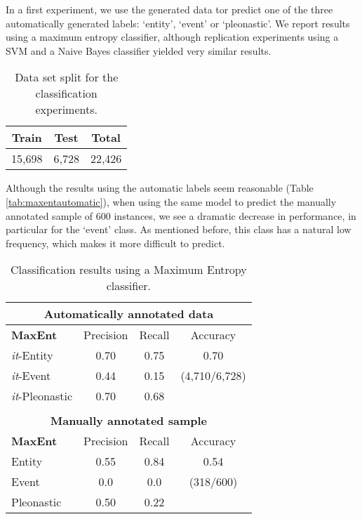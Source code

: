 \documentclass[10pt, a4paper]{article}
\begin{document}
In a first experiment, we use the generated data tor predict one of the three automatically generated labels: `entity', `event' or `pleonastic'. We report results using a maximum entropy classifier, although replication experiments using a SVM and a Naive Bayes classifier yielded very similar results. 


\begin{table}[h!]\centering
\begin{tabular}{ccc}
\toprule
\textbf{Train} & \textbf{Test} & \textbf{Total} \\
\midrule
15,698 & 6,728 & 22,426 \\
\bottomrule
\end{tabular}
\caption{Data set split for the classification experiments. }
\end{table}

 Although the results using the automatic labels seem reasonable (Table  \ref{tab:maxentautomatic}), when using the same model to predict the manually annotated sample of 600 instances, we see a dramatic decrease in performance, in particular for the `event' class. As mentioned before, this class has a natural low frequency, which makes it more difficult to predict. 

\begin{center} \begin{table}[h!]\centering 
\begin{tabular}{l ccc}
\multicolumn{4}{c}{ \textbf{Automatically annotated data}}\\ 
\toprule
\textbf{MaxEnt}& Precision & Recall & Accuracy \\ 
\midrule 
\textit{it}-Entity &0.70 & 0.75 &   0.70\\
\textit{it}-Event & 0.44 & 0.15 & (4,710/6,728) \\
\textit{it}-Pleonastic & 0.70 & 0.68&   \\ 
\midrule & & & \\
\multicolumn{4}{c}{\textbf{Manually annotated sample}}  \\ 
\midrule
\textbf{MaxEnt}& Precision & Recall & Accuracy \\ 
\midrule 
Entity &0.55 & 0.84 &0.54\\ 
Event &0.0 & 0.0 & (318/600)\\ 
Pleonastic & 0.50 & 0.22 & \\ 
\bottomrule
\end{tabular} \caption{Classification results using a Maximum Entropy
classifier.} 
\end{table}\label{tab:maxentautomatic}
\end{center}
\end{document}
